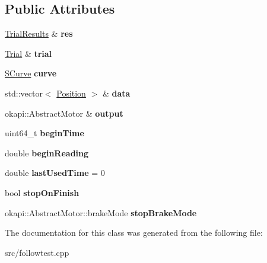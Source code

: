 \subsection*{Public Attributes}
\begin{DoxyCompactItemize}
\item 
\mbox{\label{classCurveDriver_afa8957da40dcef07c00047f9a12f5320}} 
\hyperlink{structTrialResults}{Trial\+Results} \& {\bfseries res}
\item 
\mbox{\label{classCurveDriver_a4712df5b8884fdd496fbd512c283d7c3}} 
\hyperlink{structTrial}{Trial} \& {\bfseries trial}
\item 
\mbox{\label{classCurveDriver_af272be4d71737ca39590b591c472a7f5}} 
\hyperlink{classSCurve}{S\+Curve} {\bfseries curve}
\item 
\mbox{\label{classCurveDriver_a92a10c15098ba3e2aaa42738f9b0d165}} 
std\+::vector$<$ \hyperlink{structPosition}{Position} $>$ \& {\bfseries data}
\item 
\mbox{\label{classCurveDriver_a2ea2f4bf49841ec7e87c13bb57a48b45}} 
okapi\+::\+Abstract\+Motor \& {\bfseries output}
\item 
\mbox{\label{classCurveDriver_a5c474d5b677786a32b77f3d64af17487}} 
uint64\+\_\+t {\bfseries begin\+Time}
\item 
\mbox{\label{classCurveDriver_ad923e6b468b113058348bc99d5f4527b}} 
double {\bfseries begin\+Reading}
\item 
\mbox{\label{classCurveDriver_ad8441a570e2ed8fd33372ed3aa483412}} 
double {\bfseries last\+Used\+Time} = 0
\item 
\mbox{\label{classCurveDriver_a257a08923ce5d9341577a1212259b523}} 
bool {\bfseries stop\+On\+Finish}
\item 
\mbox{\label{classCurveDriver_a79818829bc9d403361ea7c108edbd110}} 
okapi\+::\+Abstract\+Motor\+::brake\+Mode {\bfseries stop\+Brake\+Mode}
\end{DoxyCompactItemize}


The documentation for this class was generated from the following file\+:\begin{DoxyCompactItemize}
\item 
src/followtest.\+cpp\end{DoxyCompactItemize}
